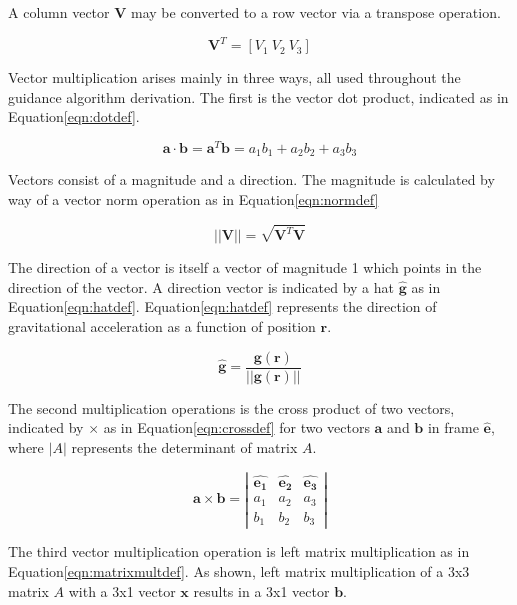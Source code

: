 A column vector $\bm{V}$ may be converted to a row vector via a transpose operation.

\begin{equation*}
\bm{V}^T = [V_1\:V_2\:V_3]
\end{equation*}

Vector multiplication arises mainly in three ways, all used throughout the guidance algorithm derivation. The first is the vector dot product, indicated as in Equation\:\ref{eqn:dotdef}.

\begin{equation}
\label{eqn:dotdef}
\bm{a}\cdot\bm{b} = \bm{a}^T\bm{b} = a_1b_1 + a_2b_2 + a_3b_3
\end{equation}

Vectors consist of a magnitude and a direction. The magnitude is calculated by way of a vector norm operation as in Equation\:\ref{eqn:normdef}

\begin{equation}
\label{eqn:normdef}
||\bm{V}|| = \sqrt{\bm{V}^T\bm{V}}
\end{equation}

The direction of a vector is itself a vector of magnitude 1 which points in the direction of the vector. A direction vector is indicated by a hat $\hat{\bm{g}}$ as in Equation\:\ref{eqn:hatdef}. Equation\:\ref{eqn:hatdef} represents the direction of gravitational acceleration as a function of position $\bm{r}$.

\begin{equation}
\label{eqn:hatdef}
\hat{\bm{g}} = \frac{\bm{g(\bm{r})}}{||\bm{g(\bm{r})}||}
\end{equation}


The second multiplication operations is the cross product of two vectors, indicated by $\times$ as in Equation\:\ref{eqn:crossdef} for two vectors $\bm{a}$ and $\bm{b}$ in frame $\hat{\bm{e}}$, where $|A|$ represents the determinant of matrix $A$. 

\begin{equation}
\label{eqn:crossdef}
\bm{a}\times\bm{b} = 
\left|
\begin{matrix}
\hat{\bm{e_1}} & \hat{\bm{e_2}} & \hat{\bm{e_3}} \\
a_1 & a_2 & a_3 \\
b_1 & b_2 & b_3
\end{matrix}
\right|
\end{equation}


The third vector multiplication operation is left matrix multiplication as in Equation\:\ref{eqn:matrixmultdef}. As shown, left matrix multiplication of a 3x3 matrix $A$ with a 3x1 vector $\bm{x}$ results in a 3x1 vector $\bm{b}$. 

